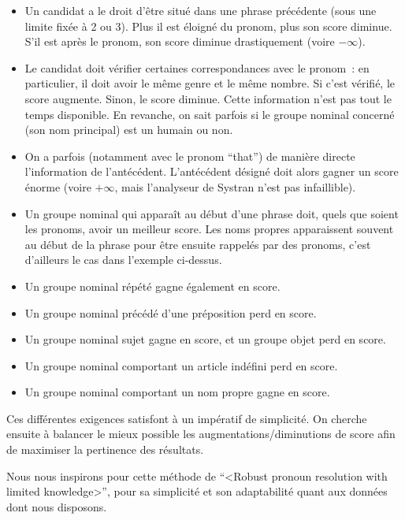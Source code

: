\documentclass[a4paper, 12pt]{article}
\begin{document}
\begin{itemize}
 \item Un candidat a le droit d'être situé dans une phrase précédente (sous une limite fixée à 2 ou 3). Plus il est éloigné du pronom, plus son score diminue. S'il est après le pronom, son score diminue drastiquement (voire $-\infty$).
 \item Le candidat doit vérifier certaines correspondances avec le pronom~: en particulier, il doit avoir le même genre et le même nombre. Si c'est vérifié, le score augmente. Sinon, le score diminue. Cette information n'est pas tout le temps disponible. En revanche, on sait parfois si le groupe nominal concerné (son nom principal) est un humain ou non.
 \item On a parfois (notamment avec le pronom ``that'') de manière directe l'information de l'antécédent. L'antécédent désigné doit alors gagner un score énorme (voire $+\infty$, mais l'analyseur de Systran n'est pas infaillible).
 \item Un groupe nominal qui apparaît au début d'une phrase doit, quels que soient les pronoms, avoir un meilleur score. Les noms propres apparaissent souvent au début de la phrase pour être ensuite rappelés par des pronoms, c'est d'ailleurs le cas dans l'exemple ci-dessus.
 \item Un groupe nominal répété gagne également en score.
 \item Un groupe nominal précédé d'une préposition perd en score.
 \item Un groupe nominal sujet gagne en score, et un groupe objet perd en score. 
 \item Un groupe nominal comportant un article indéfini perd en score.
 \item Un groupe nominal comportant un nom propre gagne en score.
\end{itemize}

Ces différentes exigences satisfont à un impératif de simplicité. On cherche ensuite à balancer le mieux possible les augmentations/diminutions de score afin de maximiser la pertinence des résultats.

Nous nous inspirons pour cette méthode de ``<Robust pronoun resolution with limited knowledge>'', pour sa simplicité et son adaptabilité quant aux données dont nous disposons.



\end{document}
